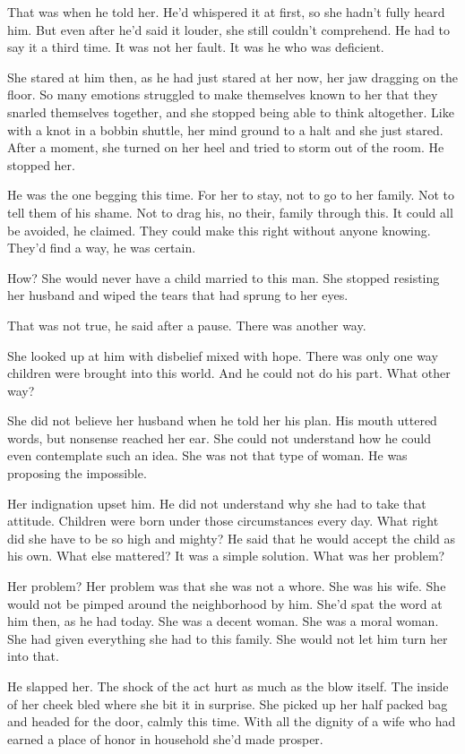 \documentclass{article}
\begin{document}
That was when he told her. He'd whispered it at first, so she hadn't fully heard him. But even after he'd said it louder, she still couldn't comprehend. He had to say it a third time. It was not her fault. It was he who was deficient. 

She stared at him then, as he had just stared at her now, her jaw dragging on the floor. So many emotions struggled to make themselves known to her that they snarled themselves together, and she stopped being able to think altogether. Like with a knot in a bobbin shuttle, her mind ground to a halt and she just stared. After a moment, she turned on her heel and tried to storm out of the room. He stopped her.

He was the one begging this time. For her to stay, not to go to her family. Not to tell them of his shame. Not to drag his, no their, family through this. It could all be avoided, he claimed. They could make this right without anyone knowing. They'd find a way, he was certain.

How? She would never have a child married to this man. She stopped resisting her husband and wiped the tears that had sprung to her eyes.

That was not true, he said after a pause. There was another way. 

She looked up at him with disbelief mixed with hope. There was only one way children were brought into this world. And he could not do his part. What other way?

She did not believe her husband when he told her his plan. His mouth uttered words, but nonsense reached her ear. She could not understand how he could even contemplate such an idea. She was not that type of woman. He was proposing the impossible.

Her indignation upset him. He did not understand why she had to take that attitude. Children were born under those circumstances every day. What right did she have to be so high and mighty? He said that he would accept the child as his own. What else mattered? It was a simple solution. What was her problem?

Her problem? Her problem was that she was not a whore. She was his wife. She would not be pimped around the neighborhood by him. She'd spat the word at him then, as he had today. She was a decent woman. She was a moral woman. She had given everything she had to this family. She would not let him turn her into that.

He slapped her. The shock of the act hurt as much as the blow itself. The inside of her cheek bled where she bit it in surprise. She picked up her half packed bag and headed for the door, calmly this time. With all the dignity of a wife who had earned a place of honor in household she'd made prosper. 
\end{document}
